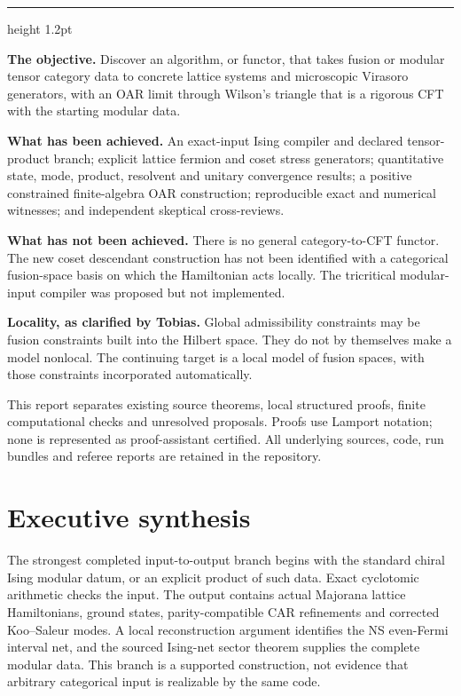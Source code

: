 \begin{titlepage}
\maketitle
\thispagestyle{empty}
\vspace{1.5em}
{\color{accent}\hrule height 1.2pt}
\vspace{1.2em}
\textbf{The objective.} Discover an algorithm, or functor, that takes fusion
or modular tensor category data to concrete lattice systems and microscopic
Virasoro generators, with an OAR limit through Wilson's triangle that is a
rigorous CFT with the starting modular data.

\textbf{What has been achieved.} An exact-input Ising compiler and declared
tensor-product branch; explicit lattice fermion and coset stress generators;
quantitative state, mode, product, resolvent and unitary convergence results;
a positive constrained finite-algebra OAR construction; reproducible exact
and numerical witnesses; and independent skeptical cross-reviews.

\textbf{What has not been achieved.} There is no general category-to-CFT
functor. The new coset descendant construction has not been identified with
a categorical fusion-space basis on which the Hamiltonian acts locally.
The tricritical modular-input compiler was proposed but not implemented.

\textbf{Locality, as clarified by Tobias.} Global admissibility constraints
may be fusion constraints built into the Hilbert space. They do not by
themselves make a model nonlocal. The continuing target is a local model of
fusion spaces, with those constraints incorporated automatically.

\vfill
\small
This report separates existing source theorems, local structured proofs,
finite computational checks and unresolved proposals. Proofs use Lamport
notation; none is represented as proof-assistant certified. All underlying
sources, code, run bundles and referee reports are retained in the repository.
\end{titlepage}

\section*{Executive synthesis}

The strongest completed input-to-output branch begins with the standard
chiral Ising modular datum, or an explicit product of such data. Exact
cyclotomic arithmetic checks the input. The output contains actual Majorana
lattice Hamiltonians, ground states, parity-compatible CAR refinements and
corrected Koo--Saleur modes. A local reconstruction argument identifies the
NS even-Fermi interval net, and the sourced Ising-net sector theorem supplies
the complete modular data. This branch is a supported construction, not
evidence that arbitrary categorical input is realizable by the same code.

